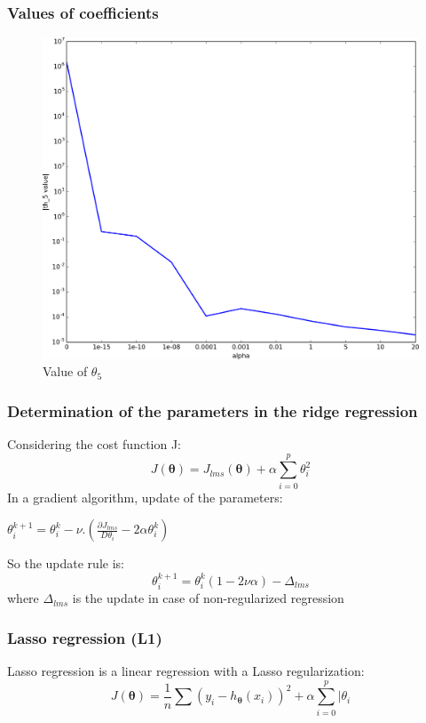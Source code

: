\documentclass[handout]{beamer}
\begin{document}
\begin{frame}
\frametitle{Values of coefficients}
\vspace{-2em}
\begin{table}
\resizebox{\textwidth}{!}{%
}
\end{table}
\begin{figure}
\includegraphics[height=0.4\textheight]{./fig/L1/coefs_th5_ridge.png}\\
Value of $\theta_5$
\end{figure}
\end{frame}

\begin{frame}
\frametitle{Determination of the parameters in the ridge regression}
Considering the cost function J:
$$
J(\bm{\theta}) =J_{lms}(\bm{\theta}) + \alpha \sum_{i=0}^p \theta_i^2
$$
In a gradient algorithm, update of the parameters:

$\theta^{k+1}_i = \theta^k_i - \nu.(\frac{\partial J_{lms}}{D\theta_i} - 2\alpha\theta^k_i)$

So the update rule is:
$$
\theta^{k+1}_i = \theta^k_i(1-2 \nu \alpha) - \Delta_{lms}
$$
where
$\Delta_{lms}$ is the update in case of non-regularized regression

\end{frame}


\begin{frame}
\frametitle{Lasso regression (L1)}
\begin{block}{}
Lasso regression is a linear regression with a Lasso regularization:
$$
J(\bm{\theta}) = \frac{1}{n} \sum (y_i - h_{\bm{\theta}}(x_i))^2 + \alpha \sum_{i=0}^p |\theta_i
$$
\end{block}
\end{frame}
\end{document}
